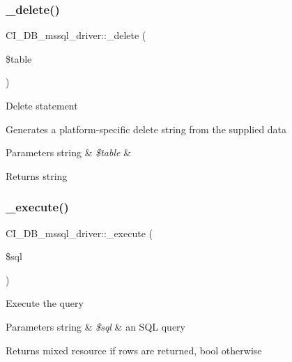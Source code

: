 \subsubsection{\texorpdfstring{\+\_\+delete()}{\_delete()}}
{\footnotesize\ttfamily C\+I\+\_\+\+D\+B\+\_\+mssql\+\_\+driver\+::\+\_\+delete (\begin{DoxyParamCaption}\item[{}]{\$table }\end{DoxyParamCaption})\hspace{0.3cm}{\ttfamily [protected]}}

Delete statement

Generates a platform-\/specific delete string from the supplied data


\begin{DoxyParams}[1]{Parameters}
string & {\em \$table} & \\
\hline
\end{DoxyParams}
\begin{DoxyReturn}{Returns}
string 
\end{DoxyReturn}
\mbox{\label{class_c_i___d_b__mssql__driver_ae2b3d9a0f255e4d9f2f69283305869aa}} 
\subsubsection{\texorpdfstring{\+\_\+execute()}{\_execute()}}
{\footnotesize\ttfamily C\+I\+\_\+\+D\+B\+\_\+mssql\+\_\+driver\+::\+\_\+execute (\begin{DoxyParamCaption}\item[{}]{\$sql }\end{DoxyParamCaption})\hspace{0.3cm}{\ttfamily [protected]}}

Execute the query


\begin{DoxyParams}[1]{Parameters}
string & {\em \$sql} & an S\+QL query \\
\hline
\end{DoxyParams}
\begin{DoxyReturn}{Returns}
mixed resource if rows are returned, bool otherwise 
\end{DoxyReturn}
\mbox{\label{class_c_i___d_b__mssql__driver_a01c5e753fee033215191c3bb42552245}} 

